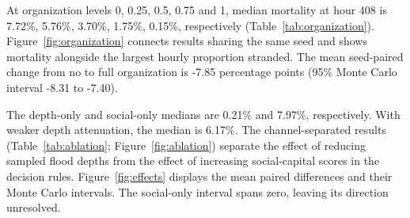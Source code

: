 At organization levels 0, 0.25, 0.5, 0.75 and 1, median mortality at hour 408 is 7.72\%, 5.76\%, 3.70\%, 1.75\%, 0.15\%, respectively (Table~\ref{tab:organization}). Figure~\ref{fig:organization} connects results sharing the same seed and shows mortality alongside the largest hourly proportion stranded. The mean seed-paired change from no to full organization is -7.85 percentage points (95\% Monte Carlo interval -8.31 to -7.40).

The depth-only and social-only medians are 0.21\% and 7.97\%, respectively. With weaker depth attenuation, the median is 6.17\%. The channel-separated results (Table~\ref{tab:ablation}; Figure~\ref{fig:ablation}) separate the effect of reducing sampled flood depths from the effect of increasing social-capital scores in the decision rules. Figure~\ref{fig:effects} displays the mean paired differences and their Monte Carlo intervals. The social-only interval spans zero, leaving its direction unresolved.
